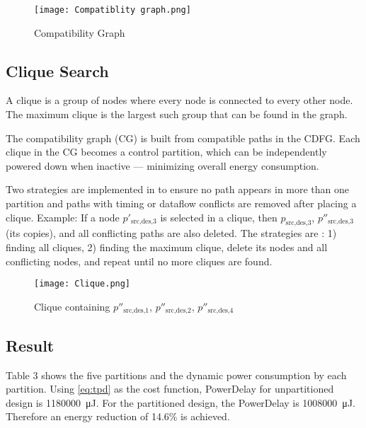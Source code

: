 \documentclass[conference]{IEEEtran}
\begin{document}
\begin{figure}[h!]
    \centering
    \texttt{[image: Compatiblity graph.png]}
    \caption{Compatibility Graph}
    \label{fig:compatibility graph}
\end{figure}



\subsection{Clique Search}
\label{subsec: clique}
A clique is a group of nodes where every node is connected to every other node. The maximum clique is the largest such group that can be found in the graph.

The compatibility graph (CG) is built from compatible paths in the CDFG. Each clique in the CG becomes a control partition, which can be independently powered down when inactive — minimizing overall energy consumption.

Two strategies are implemented in \cite{Ret} to ensure no path appears in more than one partition and paths with timing or dataflow conflicts are removed after placing a clique. Example: If a node $p'_{\text{src,des,3}}$ is selected in a clique, then $p_{\text{src,des,3}}$, $p''_{\text{src,des,3}}$ (its copies), and all conflicting paths are also deleted. The strategies are : 1) finding all cliques, 2) finding the maximum clique, delete its nodes and all conflicting nodes, and repeat until no more cliques are found.

\begin{figure}[h!]
    \centering
    \texttt{[image: Clique.png]}
    \caption{Clique containing $p''_{\text{src,des,1}}$, $p''_{\text{src,des,2}}$, $p''_{\text{src,des,4}}$}
    \label{fig:clique}
\end{figure}

\subsection{Result}
\label{subsec: result}
Table 3 shows the five partitions and the dynamic power consumption by each partition. Using \ref{eq:tpd} as the cost function, PowerDelay for unpartitioned design is \SI{1180000}{\micro\joule}. For the partitioned design, the PowerDelay is \SI{1008000}{\micro\joule}. Therefore an energy reduction of 14.6\% is achieved. 
\end{document}
